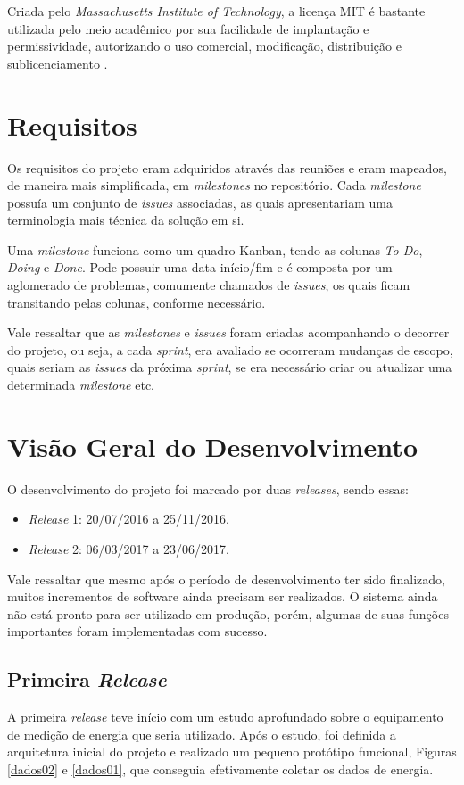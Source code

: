 Criada pelo \textit{Massachusetts Institute of Technology}, a licença MIT é bastante utilizada pelo meio acadêmico por sua facilidade de implantação e permissividade, autorizando o uso comercial, modificação, distribuição e sublicenciamento \cite{mit_license}.

\section{Requisitos}
Os requisitos do projeto eram adquiridos através das reuniões e eram mapeados, de maneira mais simplificada, em \textit{milestones} \cite{gitlab} no repositório. Cada \textit{milestone} possuía um conjunto de \textit{issues} associadas, as quais apresentariam uma terminologia mais técnica da solução em si.

Uma \textit{milestone} funciona como um quadro Kanban, tendo as colunas \textit{To Do}, \textit{Doing} e \textit{Done}. Pode possuir uma data início/fim e é composta por um aglomerado de problemas, comumente chamados de \textit{issues}, os quais ficam transitando pelas colunas, conforme necessário.

Vale ressaltar que as \textit{milestones} e \textit{issues} foram criadas acompanhando o decorrer do projeto, ou seja, a cada \textit{sprint}, era avaliado se ocorreram mudanças de escopo, quais seriam as \textit{issues} da próxima \textit{sprint}, se era necessário criar ou atualizar uma determinada \textit{milestone} etc.

\section{Visão Geral do Desenvolvimento}
O desenvolvimento do projeto foi marcado por duas \textit{releases}, sendo essas:

\begin{itemize}
    \item \textit{Release} 1: 20/07/2016 a 25/11/2016.
    \item \textit{Release} 2: 06/03/2017 a 23/06/2017.
\end{itemize}

Vale ressaltar que mesmo após o período de desenvolvimento ter sido finalizado, muitos incrementos de software ainda precisam ser realizados. O sistema ainda não está pronto para ser utilizado em produção, porém, algumas de suas funções importantes foram implementadas com sucesso.

\subsection{Primeira \textit{Release}}
A primeira \textit{release} teve início com um estudo aprofundado sobre o equipamento de medição de energia que seria utilizado. Após o estudo, foi definida a arquitetura inicial do projeto e realizado um pequeno protótipo funcional, Figuras \ref{dados02} e \ref{dados01}, que conseguia efetivamente coletar os dados de energia.

